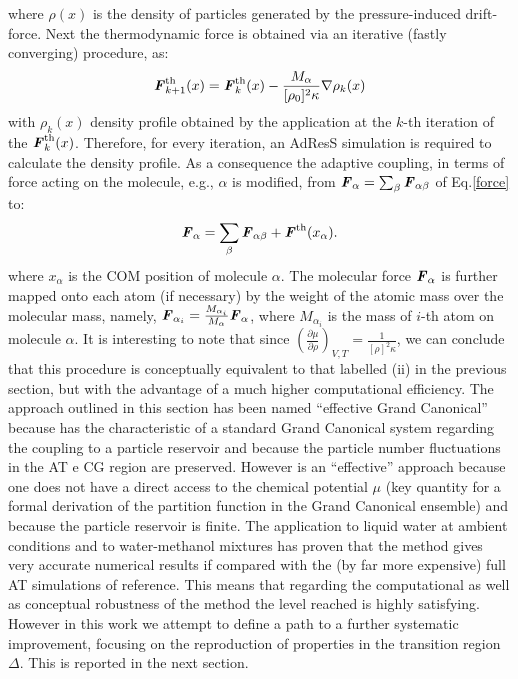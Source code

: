 \documentclass[aps,pre,preprint]{revtex4}
\newcommand{\recheck}[1]{{\color{red} #1}}
\newcommand{\redc}[1]{{\color{red} #1}}
\renewcommand{\v}[1]{\textbf{\textit{#1}}}
\begin{document}
where $\rho(x)$ is the density of particles generated by the pressure-induced drift-force. Next the thermodynamic force is obtained via an iterative (fastly converging) procedure, as:
\begin{equation}
{\v F}_{k+1}^{\textrm{th}}(x)={\v F}_{k}^{\textrm{th}}(x)-\frac{M_{\alpha}}{[\rho_{0}]^{2}\kappa}\nabla\rho_{k}(x)
\label{iter}
\end{equation}
with $\rho_k(x)$ density profile obtained by the application at the $k$-th iteration of the ${\v F}_k^{\textrm{th}}(x)$.
\redc{Therefore, for every iteration, an AdResS simulation is required to calculate the density profile.}
As a consequence the adaptive coupling, in terms of force acting on the molecule, e.g., $\alpha$ is modified, from ${\v F}_{\alpha}=\sum_{\beta}{\v F}_{\alpha\beta}$ of Eq.\ref{force} to:
\begin{equation}
{\v F}_{\alpha}=\sum_{\beta}{\v F}_{\alpha\beta}+{\v F}^{\textrm{th}}(x_{\alpha}).
\label{mody}
\end{equation}
\recheck{
  where $x_\alpha$ is the COM position of molecule $\alpha$.
  The molecular force ${\v F}_{\alpha}$ 
  is further mapped onto each atom (if necessary) by the weight
of the atomic mass over the molecular mass, namely,
$\v F_{\alpha_i} = \frac{M_{\alpha_i}}{M_\alpha}\v F_{\alpha}$, where
$M_{\alpha_i}$ is the mass of $i$-th atom on molecule $\alpha$.}
 It is interesting to note that since $\left({\frac{\partial\mu}{\partial\rho}}\right)_{V,T}=\frac{1}{[\rho]^{2}\kappa}$, we can conclude that this procedure is conceptually equivalent to that labelled (ii) in the previous section, but with the advantage of a much higher computational efficiency.
The approach outlined in this section has been named ``effective Grand Canonical'' because has the characteristic of a standard Grand Canonical system regarding the coupling to a particle reservoir and because the particle number fluctuations in the AT e CG region are preserved. However is an ``effective'' approach because one does not have a direct access to the chemical potential $\mu$ (key quantity for a formal derivation of the partition function in the Grand Canonical ensemble) and because the particle reservoir is finite. The application to liquid water at ambient conditions \cite{prlgc} and to water-methanol mixtures \cite{debash} has proven that the method gives very accurate numerical results if compared with the (by far more expensive) full AT simulations of reference. This means that regarding the computational as well as conceptual robustness of the method the level reached is highly satisfying. However in this work we attempt to define a path to a further systematic improvement, focusing on the reproduction of properties in the transition region $\Delta$.
This is reported in the next section.
\end{document}
